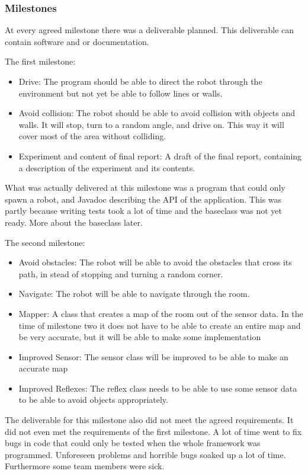 \documentclass[titlepage, a4paper,10pt]{article}
\begin{document}
\subsubsection{Milestones}
At every agreed milestone there was a deliverable planned. This deliverable can contain software and or documentation.

The first milestone:
\begin{itemize}
\item Drive: The program should be able to direct the robot through the environment but not yet be able to follow lines or walls.
\item Avoid collision: The robot should be able to avoid collision with objects and walls. It will stop, turn to a random angle, and drive on. This way it will cover most of the area without colliding.
\item Experiment and content of final report: A draft of the final report, containing a description of the experiment and its contents.
\end{itemize}

What was actually delivered at this milestone was a program that could only spawn a robot, and Javadoc describing the API of the application. This was partly because writing tests took a lot of time and the baseclass was not yet ready. More about the baseclass later.

The second milestone:
\begin{itemize}
\item Avoid obstacles: The robot will be able to avoid the obstacles that cross its path, in stead of stopping and turning a random corner.
\item Navigate: The robot will be able to navigate through the room.
\item Mapper: A class that creates a map of the room out of the sensor data. In the time of milestone two it does not have to be able to create an entire map and be very accurate, but it will be able to make some implementation
\item Improved Sensor: The sensor class will be improved to be able to make an accurate map
\item Improved Reflexes: The reflex class needs to be able to use some sensor data to be able to avoid objects appropriately.
\end{itemize}

The deliverable for this milestone also did not meet the agreed requirements. It
did not even met the requirements of the first milestone. A lot of time went to
fix bugs in code that could only be tested when the whole framework was programmed.
Unforeseen problems and horrible bugs soaked up a lot of time. Furthermore some
team members were sick.  
\end{document}
